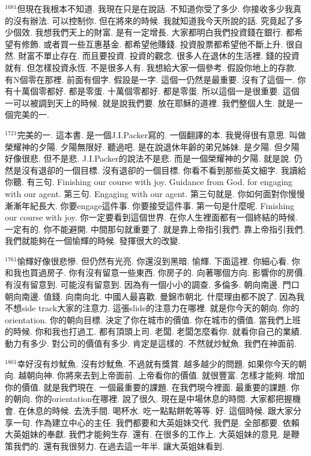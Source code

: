 \documentclass{book}
\begin{document}
$^{1681}$但現在我根本不知道.
我現在只是在說話.
不知道你受了多少.
你接收多少我真的沒有辦法.
可以控制你.
但在將來的時候.
我就知道我今天所說的話.
究竟起了多少個效.
我想我們天上的財富.
是有一定增長.
大家都明白我們投資錢在銀行.
都希望有修飾.
或者買一些互惠基金.
都希望他賺錢.
投資股票都希望他不斷上升.
很自然.
財富不單止存在.
而且要投資.
投資的觀念.
很多人在退休的生活裡.
錢的投資就有.
但怎樣投資永恆.
不是很多人有.
我想給大家一個參考.
假設你地上的存款.
有N個零在那裡.
前面有個字.
假設是一字.
這個一仍然是最重要.
沒有了這個一.
你有十萬個零都好.
都是零蛋.
十萬個零都好.
都是零蛋.
所以這個一是很重要.
這個一可以被調到天上的時候.
就是說我們要.
放在耶穌的道裡.
我們整個人生.
就是一個完美的一.

$^{1721}$完美的一.
這本書.
是一個J.I.Packer寫的.
一個翻譯的本.
我覺得很有意思.
叫做榮耀神的夕陽.
夕陽無限好.
聽過吧.
是在說退休年齡的弟兄姊妹.
是夕陽.
但夕陽好像很悲.
但不是悲.
J.I.Packer的說法不是悲.
而是一個榮耀神的夕陽.
就是說.
仍然是沒有退卻的一個目標.
沒有退卻的一個目標.
你看不看到那些英文細字.
我讀給你聽.
有三句.
Finishing our course with joy.
Guidance from God.
for engaging with our agent.
第三句.
Engaging with our agent.
第三句就是.
你如何面對你慢慢漸漸年紀長大.
你要engage這件事.
你要接受這件事.
第一句是什麼呢.
Finishing our course with joy.
你一定要看到這個世界.
在你人生裡面都有一個終結的時候.
一定有的.
你不能避開.
中間那句就重要了.
就是靠上帝指引我們.
靠上帝指引我們.
我們就能夠在一個愉輝的時候.
發揮很大的改變.

$^{1761}$愉輝好像很悲慘.
但仍然有光亮.
你還沒到黑暗.
愉輝.
下面這裡.
你細心看.
你和我也買過房子.
你有沒有留意一些東西.
你房子的.
向著哪個方向.
影響你的房價.
有沒有留意到.
可能沒有留意到.
因為有一個小小的調查.
多倫多.
朝向南邊.
門口朝向南邊.
值錢.
向南向北.
中國人最喜歡.
曼錦市朝北.
什麼理由都不說了.
因為我不想side track大家的注意力.
這張slide的注意力在哪裡.
就是你今天的朝向.
你的orientation.
你的朝向目標.
決定了你在城市的價值.
你在城市的價值.
當我們上班的時候.
你和我也打過工.
都有頂頭上司.
老闆.
老闆怎麼看你.
就看你自己的業績.
動力有多少.
對公司的價值有多少.
肯定是這樣的.
不然就炒魷魚.
我們在神面前.

$^{1801}$幸好沒有炒魷魚.
沒有炒魷魚.
不過就有獎賞.
越多越少的問題.
如果你今天的朝向.
越朝向神.
你將來去到上帝面前.
上帝看你的價值.
就很豐富.
怎樣才能夠.
增加你的價值.
就是我們現在.
一個最重要的課題.
在我們現今裡面.
最重要的課題.
你的朝向.
你的orientation在哪裡.
說了很久.
現在是中場休息的時間.
大家都把握機會.
在休息的時候.
去洗手間.
喝杯水.
吃一點點餅乾等等.
好.
這個時候.
跟大家分享一句.
作為建立中心的主任.
我們都要和大英姐妹交代.
我們是.
全部都要.
依賴大英姐妹的奉獻.
我們才能夠生存.
還有.
在很多的工作上.
大英姐妹的意見.
是鞭策我們的.
還有我很努力.
在過去這一年半.
讓大英姐妹看到.
\end{document}
